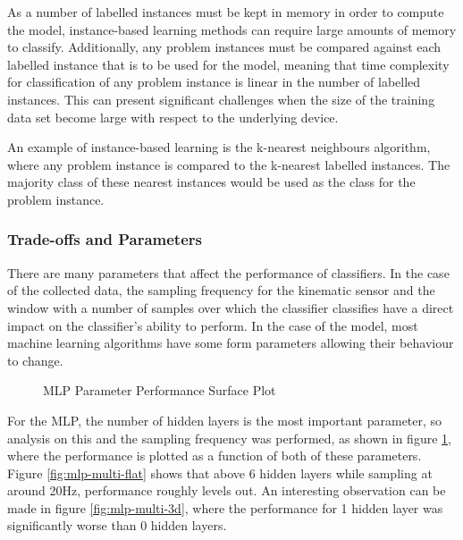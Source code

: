 As a number of labelled instances must be kept in memory in order to compute the model, instance-based learning methods can require large amounts of memory to classify. Additionally, any problem instances must be compared against each labelled instance that is to be used for the model, meaning that time complexity for classification of any problem instance is linear in the number of labelled instances. This can present significant challenges when the size of the training data set become large with respect to the underlying device.

An example of instance-based learning is the k-nearest neighbours algorithm, where any problem instance is compared to the k-nearest labelled instances. The majority class of these nearest instances would be used as the class for the problem instance.

\subsubsection{Trade-offs and Parameters}

There are many parameters that affect the performance of classifiers. In the case of the collected data, the sampling frequency for the kinematic sensor and the window with a number of samples over which the classifier classifies have a direct impact on the classifier's ability to perform. In the case of the model, most machine learning algorithms have some form parameters allowing their behaviour to change. 

\begin{figure}
	\centering
	\caption{MLP Parameter Performance Surface Plot \label{fig:mlp-multi}}
\end{figure}

For the MLP, the number of hidden layers is the most important parameter, so analysis on this and the sampling frequency was performed, as shown in figure \ref{fig:mlp-multi}, where the performance is plotted as a function of both of these parameters. Figure \ref{fig:mlp-multi-flat} shows that above 6 hidden layers while sampling at around 20Hz, performance roughly levels out. An interesting observation can be made in figure \ref{fig:mlp-multi-3d}, where the performance for 1 hidden layer was significantly worse than 0 hidden layers.

